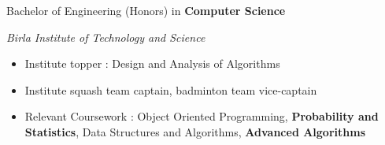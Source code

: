 %
%
%

\vspace{1mm}
\begin{scholarship}
					{
                    Bachelor of Engineering (Honors) in \textbf{Computer Science}
                    
                    \textit{Birla Institute of Technology and Science}
                    \vspace{1mm}
                    \begin{itemize}
                    	\item Institute topper : Design and Analysis of Algorithms
                    	\item Institute squash team captain, badminton team vice-captain
                    	\item Relevant Coursework : Object Oriented Programming, \textbf{Probability and Statistics}, Data Structures and Algorithms, \textbf{Advanced Algorithms}
                    \end{itemize}
                    }
\end{scholarship}